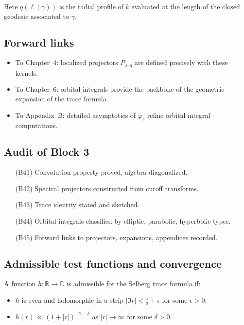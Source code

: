 \begin{remark}
Here $q(\ell(\gamma))$ is the radial profile of $k$ evaluated at the length of the closed geodesic associated to $\gamma$.
\end{remark}

\subsection*{Forward links}

\begin{itemize}
  \item To Chapter~4: localized projectors $P_{\lambda,\eta}$ are defined precisely with these kernels.
  \item To Chapter~6: orbital integrals provide the backbone of the geometric expansion of the trace formula.
  \item To Appendix~B: detailed asymptotics of $\varphi_r$ refine orbital integral computations.
\end{itemize}

\subsection*{Audit of Block 3}

\begin{itemize}
  \item[(B41)] Convolution property proved, algebra diagonalized.
  \item[(B42)] Spectral projectors constructed from cutoff transforms.
  \item[(B43)] Trace identity stated and sketched.
  \item[(B44)] Orbital integrals classified by elliptic, parabolic, hyperbolic types.
  \item[(B45)] Forward links to projectors, expansions, appendices recorded.
\end{itemize}


\subsection{Admissible test functions and convergence}

\begin{definition}
A function $h:\mathbb{R}\to\mathbb{C}$ is admissible for the Selberg trace formula if:
\begin{itemize}
  \item $h$ is even and holomorphic in a strip $|\Im r|<\tfrac12+\epsilon$ for some $\epsilon>0$,
  \item $h(r) \ll (1+|r|)^{-2-\delta}$ as $|r|\to\infty$ for some $\delta>0$.
\end{itemize}
\end{definition}

